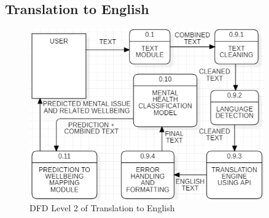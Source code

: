 \subsection{Translation to English}

\begin{figure}[h!]  
    \centering
    \includegraphics[width=0.9\textwidth]{Images/DFD L2 TE.png}  
    \caption{DFD Level 2 of Translation to English}
    \label{dfdl111}  %
\end{figure}

